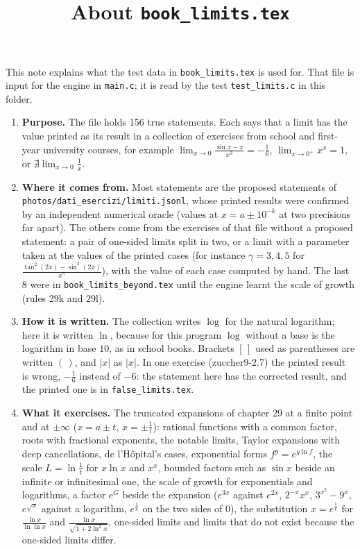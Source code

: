 \documentclass[11pt,a4paper]{article}
\title{About \texttt{book\_limits.tex}}
\author{}
\date{}
\begin{document}
\maketitle
This note explains what the test data in \texttt{book\_limits.tex} is used for. That file is input for the engine in \texttt{main.c}; it is read by the test \texttt{test\_limits.c} in this folder.

\begin{enumerate}
\item \textbf{Purpose.} The file holds 156 true statements. Each says that a limit has the value printed as its result in a collection of exercises from school and first-year university courses, for example $\lim_{x \to 0} \frac{\sin x - x}{x^{3}} = -\frac{1}{6}$, $\lim_{x \to 0^{+}} x^{x} = 1$, or $\nexists \lim_{x \to 0} \frac{1}{x}$.

\item \textbf{Where it comes from.} Most statements are the proposed statements of \texttt{photos/dati\_esercizi/limiti.jsonl}, whose printed results were confirmed by an independent numerical oracle (values at $x = a \pm 10^{-k}$ at two precisions far apart). The others come from the exercises of that file without a proposed statement: a pair of one-sided limits split in two, or a limit with a parameter taken at the values of the printed cases (for instance $\gamma = 3, 4, 5$ for $\frac{\tan^{2}(2x) - \sin^{2}(2x)}{x^{\gamma}}$), with the value of each case computed by hand. The last 8 were in \texttt{book\_limits\_beyond.tex} until the engine learnt the scale of growth (rules 29k and 29l).

\item \textbf{How it is written.} The collection writes $\log$ for the natural logarithm; here it is written $\ln$, because for this program $\log$ without a base is the logarithm in base $10$, as in school books. Brackets $[\,]$ used as parentheses are written $\left(\,\right)$, and $|x|$ as $\left|x\right|$. In one exercise (zuccher9-2.7) the printed result is wrong, $-\frac{1}{6}$ instead of $-6$: the statement here has the corrected result, and the printed one is in \texttt{false\_limits.tex}.

\item \textbf{What it exercises.} The truncated expansions of chapter 29 at a finite point and at $\pm\infty$ ($x = a \pm t$, $x = \pm\frac{1}{t}$): rational functions with a common factor, roots with fractional exponents, the notable limits, Taylor expansions with deep cancellations, de l'Hôpital's cases, exponential forms $f^{g} = e^{g \ln f}$, the scale $L = \ln\frac{1}{t}$ for $x \ln x$ and $x^{x}$, bounded factors such as $\sin x$ beside an infinite or infinitesimal one, the scale of growth for exponentials and logarithms, a factor $e^{G}$ beside the expansion ($e^{3x}$ against $e^{2x}$, $2^{-x} x^{x}$, $3^{x^{2}} - 9^{x}$, $e^{\sqrt{x}}$ against a logarithm, $e^{\frac{1}{x}}$ on the two sides of $0$), the substitution $x = e^{\frac{1}{t}}$ for $\frac{\ln x}{\ln \ln x}$ and $\frac{\ln x}{\sqrt{1 + 2\ln^{2} x}}$, one-sided limits and limits that do not exist because the one-sided limits differ.


\end{enumerate}
\end{document}
